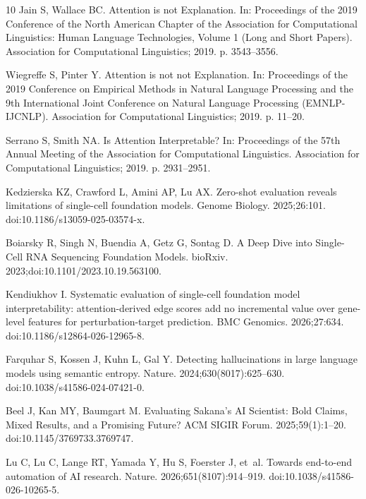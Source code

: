 \documentclass[10pt,letterpaper]{article}
\begin{document}
\begin{thebibliography}{10}
Jain S, Wallace BC.
\newblock Attention is not Explanation.
\newblock In: Proceedings of the 2019 Conference of the North American Chapter
  of the Association for Computational Linguistics: Human Language
  Technologies, Volume 1 (Long and Short Papers). Association for Computational
  Linguistics; 2019. p. 3543--3556.

Wiegreffe S, Pinter Y.
\newblock Attention is not not Explanation.
\newblock In: Proceedings of the 2019 Conference on Empirical Methods in
  Natural Language Processing and the 9th International Joint Conference on
  Natural Language Processing (EMNLP-IJCNLP). Association for Computational
  Linguistics; 2019. p. 11--20.

Serrano S, Smith NA.
\newblock Is Attention Interpretable?
\newblock In: Proceedings of the 57th Annual Meeting of the Association for
  Computational Linguistics. Association for Computational Linguistics; 2019.
  p. 2931--2951.

Kedzierska KZ, Crawford L, Amini AP, Lu AX.
\newblock Zero-shot evaluation reveals limitations of single-cell foundation
  models.
\newblock Genome Biology. 2025;26:101.
\newblock doi:{10.1186/s13059-025-03574-x}.

Boiarsky R, Singh N, Buendia A, Getz G, Sontag D.
\newblock A Deep Dive into Single-Cell {RNA} Sequencing Foundation Models.
\newblock bioRxiv. 2023;doi:{10.1101/2023.10.19.563100}.

Kendiukhov I.
\newblock Systematic evaluation of single-cell foundation model
  interpretability: attention-derived edge scores add no incremental value over
  gene-level features for perturbation-target prediction.
\newblock BMC Genomics. 2026;27:634.
\newblock doi:{10.1186/s12864-026-12965-8}.

Farquhar S, Kossen J, Kuhn L, Gal Y.
\newblock Detecting hallucinations in large language models using semantic
  entropy.
\newblock Nature. 2024;630(8017):625--630.
\newblock doi:{10.1038/s41586-024-07421-0}.

Beel J, Kan MY, Baumgart M.
\newblock Evaluating {Sakana's} {AI} {Scientist}: Bold Claims, Mixed Results,
  and a Promising Future?
\newblock ACM SIGIR Forum. 2025;59(1):1--20.
\newblock doi:{10.1145/3769733.3769747}.

Lu C, Lu C, Lange RT, Yamada Y, Hu S, Foerster J, et~al.
\newblock Towards end-to-end automation of {AI} research.
\newblock Nature. 2026;651(8107):914--919.
\newblock doi:{10.1038/s41586-026-10265-5}.


\end{thebibliography}
\end{document}

